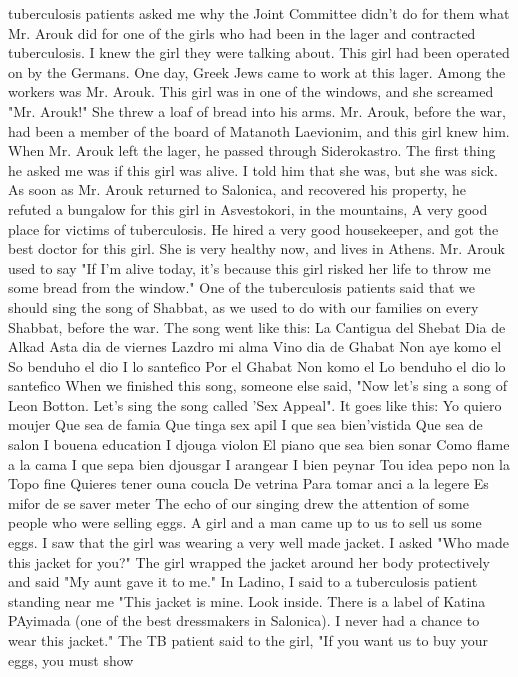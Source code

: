 tuberculosis patients asked me why the Joint Committee didn't do for them what Mr. Arouk did for one of the girls who had been in the lager and contracted tuberculosis. 
I knew the girl they were talking about. This girl had been operated on by the 
Germans. One day, Greek Jews came to work at this lager. Among the workers was Mr. 
Arouk. This girl was in one of the windows, and she screamed "Mr. Arouk!" She threw a 
loaf of bread into his arms. Mr. Arouk, before the war, had been a member of the board 
of Matanoth Laevionim, and this girl knew him. When Mr. Arouk left the lager, he passed 
through Siderokastro. The first thing he asked me was if this girl was alive. I told 
him that she was, but she was sick. As soon as Mr. Arouk returned to Salonica, and recovered his property, he refuted a bungalow for this girl in Asvestokori, in the mountains,
A very good place for victims of tuberculosis. He hired a very good housekeeper, and got the best doctor for this girl. She is very healthy now, and lives in Athens. Mr. Arouk used to 
say "If I'm alive today, it's because this girl risked her life to throw me some bread 
from the window." 
One of the tuberculosis patients said that we should sing the song of Shabbat, as we used to 
do with our families on every Shabbat, before the war. The song went like this: 
La Cantigua del Shebat 
Dia de Alkad 
Asta dia de viernes 
Lazdro mi alma 
Vino dia de Ghabat 
Non aye komo el 
So benduho el dio 
I lo santefico 
Por el Ghabat 
Non komo el 
Lo benduho el dio 
lo santefico 
When we finished this song, someone else said, "Now let's sing a song of Leon Botton. 
Let's sing the song called 'Sex Appeal". It goes like this: 
Yo quiero moujer 
Que sea de famia 
Que tinga sex apil 
I que sea bien'vistida 
Que sea de salon 
I bouena education 
I djouga violon 
El piano que sea bien sonar 
Como flame a la cama 
I que sepa bien djousgar 
I arangear 
I bien peynar 
Tou idea pepo non la 
Topo fine 
Quieres tener ouna coucla 
De vetrina 
Para tomar anci a la legere 
Es mifor de se saver meter 
The echo of our singing drew the attention of some people who were selling eggs. 
A girl and a man came up to us to sell us some eggs. I saw that the girl was wearing 
a very well made jacket. I asked "Who made this jacket for you?" The girl wrapped the 
jacket around her body protectively and said "My aunt gave it to me." 
In Ladino, I said to a tuberculosis patient standing near me "This jacket is mine. Look inside. There is a label of Katina PAyimada (one of the best dressmakers in Salonica). I never had a chance to wear this jacket." 
The TB patient said to the girl, "If you want us to buy your eggs, you must show 
